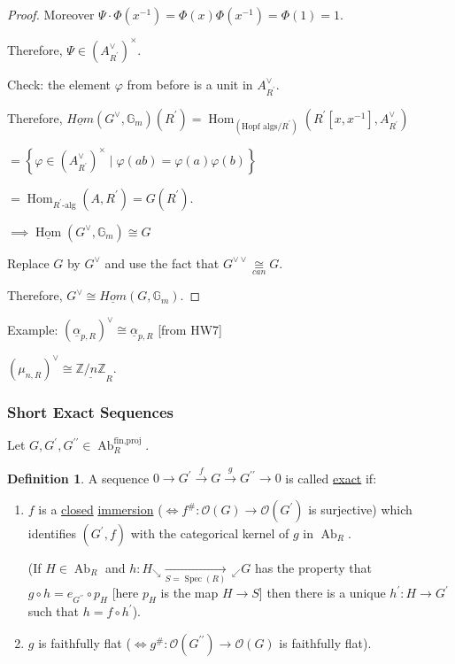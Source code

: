\documentclass{article}
\theoremstyle{definition}
\newtheorem*{definition}{Definition}
\numberwithin{theorem}{subsection}
\begin{document}
\begin{proof}
        Moreover \(\Psi \cdot \Phi(x ^{-1}) = \Phi(x) \Phi(x ^{-1}) = \Phi(1) = 1\).

        Therefore, \(\Psi \in (A^\vee_{R^{\prime}})^\times\).

        Check: the element \(\varphi\) from before is a unit in \(A^\vee_{R^{\prime}}\).

        Therefore, \(\underline{Hom}(G^\vee, \mathbb{G}_m)(R^{\prime}) = \operatorname{Hom}_{(\text{Hopf algs} / R^{\prime})}(R^{\prime}[x,x ^{-1}], A^\vee_{R^{\prime}})\)
        
        \(= \left\{ \varphi \in (A^\vee_{R^{\prime}})^\times \mid \varphi(ab) = \varphi (a) \varphi(b) \right\}\) 

        \(= \operatorname{Hom}_{R^{\prime}\text{-alg}}(A,R^{\prime}) = G(R^{\prime})\).
        
        \(\implies \underline{\operatorname{Hom}}(G^\vee,\mathbb{G}_m) \cong G \) 

        Replace \(G\) by \(G^\vee\) and use the fact that \(G^{\vee\vee} \underset{can}{\cong} G\).
        
        Therefore, \(G^\vee \cong \underline{Hom}(G,\mathbb{G}_m)\).
        
    \end{proof}

    Example: \((\underline{\alpha}_{p,R})^\vee \cong \underline{\alpha}_{p,R}\) [from HW7]
        
    \((\mu_{n,R})^\vee \cong \underline{\mathbb{Z} / n\mathbb{Z}}_R\).

    \subsubsection{Short Exact Sequences}

    Let \(G,G^{\prime} ,G^{\prime\prime} \in \operatorname{Ab}_R^{\text{fin,proj}}\).
    
    \begin{definition}
        A sequence \(0 \to G^{\prime} \xrightarrow{f} G \xrightarrow{g} G^{\prime\prime} \to 0\) is called \underline{exact} if:

        \begin{enumerate}[label=\roman*)]
            \item \(f\) is a \underline{closed} \underline{immersion} (\(\iff f^\# : \mathcal{O}(G) \to \mathcal{O}(G^{\prime})\) is surjective) which identifies \((G^{\prime}, f)\) with the categorical kernel of \(g\) in \(\operatorname{Ab}_R\).
            
            (If \(H \in \operatorname{Ab}_R\) and \(h: H_{\searrow} \xrightarrow[S = \operatorname{Spec}(R)]{} \,_{\swarrow} G\) has the property that \(g \circ h = e_{G^{\prime\prime}} \circ p_H\) [here \(p_H\) is the map \(H \to S\)] then there is a unique \(h^{\prime}: H \to G^{\prime}\) such that \(h = f \circ h^{\prime}\)).

            \item \(g\) is faithfully flat (\(\iff g^\#: \mathcal{O}(G^{\prime\prime}) \to \mathcal{O}(G)\) is faithfully flat).
        \end{enumerate} 
    \end{definition}
\end{document}
